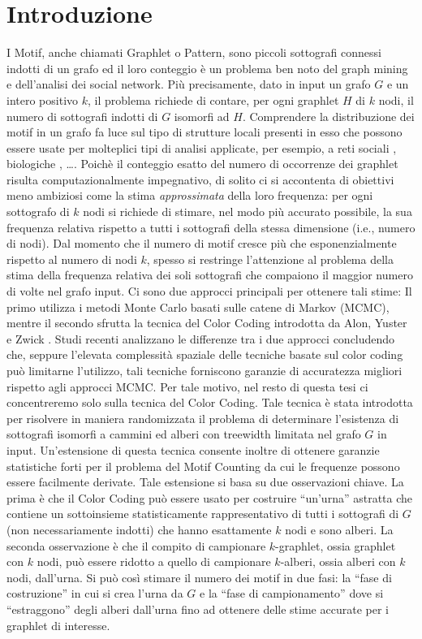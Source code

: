 \chapter{Introduzione}

I Motif, anche chiamati Graphlet o Pattern, sono piccoli sottografi connessi indotti di un grafo ed il loro conteggio è un problema ben noto del graph mining e dell'analisi dei social network. Pi\`u precisamente, dato in input un grafo $G$ e un intero positivo $k$, il problema richiede di contare,  per ogni graphlet $H$ di $k$ nodi, il numero di sottografi indotti di $G$ isomorfi ad $H$.
Comprendere la distribuzione dei motif in un grafo fa luce sul tipo di strutture locali presenti in esso che possono essere usate per molteplici tipi di analisi applicate, per esempio, a reti sociali \cite{bhuiyan2012guise,zhao2010subgraph,boldi2011layered}, biologiche \cite{alon2008biomolecular}, \dots.
Poich\`e il conteggio esatto del numero di occorrenze dei graphlet risulta computazionalmente impegnativo, di solito ci si accontenta di obiettivi meno ambiziosi come la stima \emph{approssimata} della loro frequenza: per ogni sottografo di $k$ nodi si richiede di stimare, nel modo pi\`u accurato possibile, la sua frequenza relativa rispetto a tutti i sottografi della stessa dimensione (i.e., numero di nodi).
Dal momento che il numero di motif cresce più che esponenzialmente rispetto al numero di nodi $k$, spesso si restringe l'attenzione al problema della stima della frequenza relativa dei soli sottografi che compaiono il maggior numero di volte nel grafo input.
Ci sono due approcci principali per ottenere tali stime:
Il primo utilizza i metodi Monte Carlo basati sulle catene di Markov (MCMC), mentre il secondo sfrutta la tecnica del Color Coding introdotta da Alon, Yuster e Zwick \cite{alon1995color}.
Studi recenti analizzano le differenze tra i due approcci concludendo che, seppure  l'elevata complessit\`a spaziale delle tecniche basate sul color coding può limitarne l'utilizzo, tali tecniche forniscono garanzie di accuratezza migliori rispetto agli approcci MCMC.
Per tale motivo, nel resto di questa tesi ci concentreremo solo sulla tecnica del Color Coding.
Tale tecnica \`e stata introdotta per risolvere in maniera randomizzata il problema di determinare l'esistenza di sottografi isomorfi a cammini ed alberi con treewidth limitata nel grafo $G$ in input.
Un'estensione di questa tecnica consente inoltre di ottenere garanzie statistiche forti per il problema del Motif Counting da cui le frequenze possono essere facilmente derivate.
Tale estensione si basa su due osservazioni chiave.
La prima \`e che il Color Coding pu\`o essere usato per costruire ``un'urna'' astratta che contiene un sottoinsieme statisticamente rappresentativo di tutti i sottografi di $G$ (non necessariamente indotti) che hanno esattamente $ k $ nodi e sono alberi.
La seconda osservazione \`e che il compito di campionare $ k $-graphlet, ossia graphlet con $ k $ nodi, pu\`o essere ridotto a quello di campionare $ k $-alberi, ossia alberi con $ k $ nodi, dall'urna.
Si pu\`o cos\`i stimare il numero dei motif in due fasi: la ``fase di costruzione'' in cui si crea l'urna da $G$ e la ``fase di campionamento'' dove si ``estraggono'' degli alberi dall'urna fino ad ottenere delle stime accurate per i graphlet di interesse.

